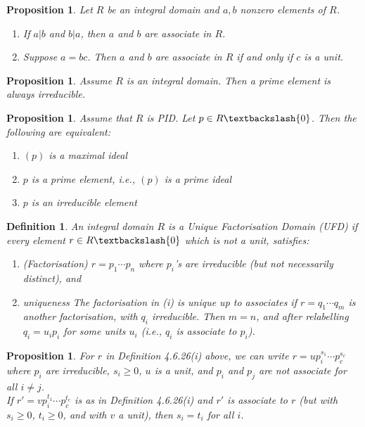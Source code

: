 \documentclass[a4paper,8pt]{article}
\newcommand{\hlt}[1]{\textit{{\color{blue}#1}}}
\theoremstyle{theorem}
\newtheorem{proposition}[theorem]{Proposition}
\newtheorem{definition}[theorem]{Definition}
\begin{document}
\begin{proposition}
Let $R$ be an integral domain and $a,b$ nonzero elements of $R$.	
\begin{enumerate}[label=(\roman*)]
\item If $a|b$ and $b|a$, then $a$ and $b$ are associate in $R$.
\item Suppose $a=bc$. Then $a$ and $b$ are associate in $R$ if and only if $c$ is a unit.
\end{enumerate}
\end{proposition}

\begin{proposition}
Assume $R$ is an integral domain. Then a prime element is always irreducible.	
\end{proposition}

\begin{proposition}
Assume that $R$ is PID. Let $p \in R \textbackslash \{0\}$. Then the following are equivalent:
\begin{enumerate}[label=(\roman*)]
\item $(p)$ is a maximal ideal
\item $p$ is a prime element, i.e., $(p)$ is a prime ideal
\item $p$ is an irreducible element
\end{enumerate}
\end{proposition}

\begin{definition}
An integral domain $R$ is a \hlt{Unique Factorisation Domain (UFD)} if every element $r \in R \textbackslash \{0\}$ which is not a unit, satisfies:
\begin{enumerate}[label=(\roman*)]
\item \hlt{(Factorisation)} $r=p_1 \cdots p_n$ where $p_i$'s are irreducible (but not necessarily distinct), and
\item \hlt{uniqueness} The factorisation in (i) is unique up to associates if $r=q_1 \cdots q_m$ is another factorisation, with $q_i$ irreducible. Then $m=n$, and after relabelling $q_i = u_i p_i$ for some units $u_i$ (i.e., $q_i$ is associate to $p_i$).
\end{enumerate}
\end{definition}

\begin{proposition}
For $r$ in Definition 4.6.26(i) above, we can write $r=u p_i^{s_1} \cdots p_c^{s_c}$ where $p_i$ are irreducible, $s_i \geq 0$, $u$ is a unit, and $p_i$ and $p_j$ are not associate for all $i \neq j$.\\
If $r'=v p_i^{t_1} \cdots p_c^{t_c}$ is as in Definition 4.6.26(i) and $r'$ is associate to $r$ (but with $s_i \geq 0$, $t_i \geq 0$, and with $v$ a unit), then $s_i = t_i$ for all $i$.
\end{proposition}
\end{document}
